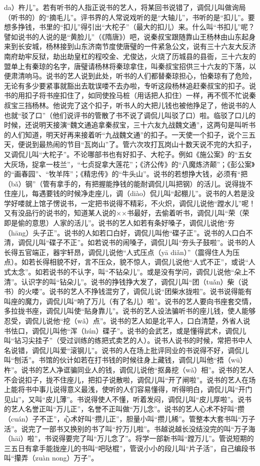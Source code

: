 \documentclass[12pt,UTF8]{ctexbook}
\begin{document}
da）杵儿”。若有听书的人指正说书的艺人，将某回书说错了，调侃儿叫做询局（听书的）的“摘毛儿”。评书界的人常说戏听的是“大轴儿”，书听的是“扣儿”。要想多挣钱，书里的“扣儿”得引出“大柁子”（最大的扣儿）来。什么叫“书扣儿”呢？譬如说书的人说的是“黄脸儿”（《隋唐》）吧，说秦叔宝跟随靠山王杨林由山东起身来到长安城，杨林接到山东济南节度使唐璧的一件紧急公文，说有三十六友大反济南府劫牢反狱，劫出劫皇杠的程咬金、尤俊达，火烧了历城县的县衙，三十六友的盟单上有秦琼的名字，唐璧请杨林将秦琼拿住，叫秦叔宝招供三十六友的下落，以便肃清响马。说书的艺人说到此处，听书的人们都替秦琼担心，怕秦琼有了危险，无论有多少要紧事就豁出去耽误喽不去办啦，专听这段杨林追赶秦叔宝的扣子。说书的用扣子将书座扣住了，如同使拴马桩（用话把人扣住）一样，再不慌不忙说秦叔宝三挡杨林。他说完了这个扣子，听书人的大把儿钱也被他挣足了，他说书的人也就“驳了口”（他们说评书的管散了书不说了调侃儿叫驳了口）啦。临驳了口儿的时候，还说明天接演“魏文通追拿秦叔宝，三十六友九战魏文通”，这两句是叫听书的人们知道，明天好再来接着听“九战魏文通”的扣子。一天使一个扣子，说个三五天，便说到最热闹的节目“瓦岗山”了。管六次攻打瓦岗山十数天说不完的大扣子，又调侃儿叫“大柁子”。不论哪部书也有好扣子、大柁子。例如《施公案》的“五女大灰场，捉拿一枝兰”，“七贞捉拿大莲花”；《济公传》的“八魔炼济颠”；《彭公案》的“画春园”、“牧羊阵”；《精忠传》的“牛头山”。说书的若想挣大钱，必须有“把（bǎ）钢”（管有拿手的，有把握能挣钱的能耐调侃儿叫把钢）的活儿。说得拢不住座儿，每遇要钱的时候净走座儿，调（diào）侃儿叫“起棚儿”。说书的人若是没学好喽就上馆子愣说书，一定把书说得不精彩，不火炽，调侃儿说他“蹚水儿”呢！又有没品行的说书的，知道某人说的××书最好，去偷着听书，调侃儿叫“荣（荣即是偷的意思）人家的活儿”。说书的艺人如若有条好嗓子，调侃儿说他“夯（hāng）头子正”。说书的人如若口白好，调侃儿叫他“碟子正”。说书的人口白不清，调侃儿叫“碟子不正”。如若说书的闹嗓子，调侃儿叫“夯头子鼓啦”。说书的人长得五官端正，器宇轩昂，调侃儿说他“人式压点（yā diǎn）”（震得住人为压点）。如若长得相貌不好，言不压众，貌不惊人，调侃儿说他“人式不正”，或说“人式太念”。如若说书的不认字，叫“不钻朵儿”。或是没有学问，调侃儿说他“朵上不清”。认识字的叫“钻朵儿”。说书的挣钱挣大发了，调侃儿叫“团（tuǎn）柴（说书）的火喽”。说书的艺人不挣钱混穷了，调侃儿说“团柴水拢啦”。说书说得能有叫座的魔力，调侃儿叫“响了万儿（有了名儿）啦”。说书的艺人要向书座套交情，多拉拢书座，调侃儿叫使“贴身靠儿”。说书的艺人设法骗听书的座儿钱，使人能够忍受，调侃儿说他“挖（wǎ）点”。说书的艺人如是北平人，口白清楚，外省人说书怯口，调侃儿叫他“浑（hún）碟子”。说书的会武艺，或是懂得武术，调侃儿叫“钻习尖挂子”（受过训练的练把式卖艺的人）。说书人说书的时候，常把书中人名说错，调侃儿叫爱“滚钢儿”。说书的人在场上批评同业的书说得不好，调侃儿叫“刨活”。书馆的伙计如若在打书钱的时候往身上藏钱，调侃儿叫他“捂（wū）杵”。说书的艺人净诓骗同业人的钱，调侃儿说他“抠鼻挖（wǎ）相”。说书的艺人不会说扣子，拢不住座儿，把扣子说散啦，调侃儿叫“开了闸啦”。说书的艺人在场上能将书中事儿说得意义最浅，使听的人们容易懂得，听得明白，调侃儿叫“开门见山”，又叫“皮儿薄”。书说得使人不懂，听着发闷，调侃儿叫“皮儿厚啦”。说书的艺人名誉正叫“万儿正”，名誉不正叫做“万儿念”。说书的艺人心术不好叫“攒（cuán）子不正”，心术好叫“攒儿正”，胆量小叫“攒儿稀”。管整本大套书叫“万子活”。说完了一部书又换别的书了叫“拧万儿啦”。书越说越长没结没完的叫“万子海（hāi）啦”，书说得要完了叫“万儿念了”。将学一部新书叫“蹚万儿”。管说短期的三五日有拿手能拢座儿的书叫“吧哒棍”，管说小小的段儿叫“片子活”，自己编段书叫“攥弄（zuàn nong）万子”。
\end{document}

